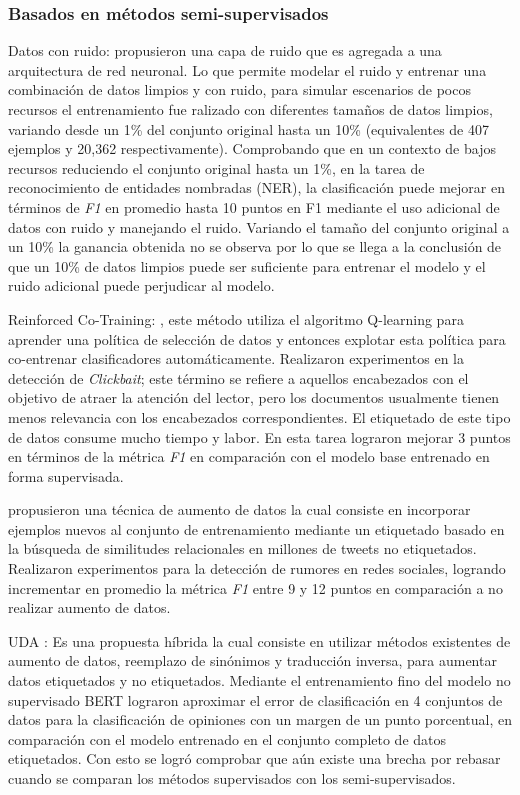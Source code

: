 \subsubsection{Basados en métodos semi-supervisados}

Datos con ruido: \citep{hedderich2018training} propusieron una capa de ruido que es agregada a una arquitectura de red neuronal. Lo que permite modelar el ruido y entrenar una combinación de datos limpios y con ruido, para simular escenarios de pocos recursos el entrenamiento fue ralizado con diferentes tamaños de datos limpios, variando desde un 1\% del conjunto original hasta un 10\% (equivalentes de 407 ejemplos y 20,362 respectivamente). Comprobando que en un contexto de bajos recursos reduciendo el conjunto original hasta un 1\%, en la tarea de reconocimiento de entidades nombradas (NER), la clasificación puede mejorar en términos de \textit{F1} en promedio hasta 10 puntos en F1 mediante el uso adicional de datos con ruido y manejando el ruido. Variando el tamaño del conjunto original a un 10\% la ganancia obtenida no se observa por lo que se llega a la conclusión de que un 10\% de datos limpios puede ser suficiente para entrenar el modelo y el ruido adicional puede perjudicar al modelo.

Reinforced Co-Training: \citep{wu2018reinforced}, este método utiliza el algoritmo Q-learning para aprender una política de selección de datos y entonces explotar esta política para co-entrenar clasificadores automáticamente. Realizaron experimentos en la detección de \textit{Clickbait}; este término se refiere a aquellos encabezados con el objetivo de atraer la atención del lector, pero los documentos usualmente tienen menos relevancia con los encabezados correspondientes. El etiquetado de este tipo de datos consume mucho tiempo y labor. En esta tarea lograron mejorar 3 puntos en términos de la métrica \textit{F1} en comparación con el modelo base entrenado en forma supervisada.

\citep{han2019neural} propusieron una técnica de aumento de datos la cual consiste en incorporar ejemplos nuevos al conjunto de entrenamiento mediante un etiquetado basado en la búsqueda de similitudes relacionales en millones de tweets no etiquetados. Realizaron experimentos para la detección de rumores en redes sociales, logrando incrementar en promedio la métrica \textit{F1} entre 9 y 12 puntos en comparación a no realizar aumento de datos.

UDA \citep{xie2019unsupervised}: Es una propuesta híbrida la cual consiste en utilizar métodos existentes de aumento de datos, reemplazo de sinónimos y traducción inversa, para aumentar datos etiquetados y no etiquetados. Mediante el entrenamiento fino del modelo no supervisado BERT lograron aproximar el error de clasificación en 4 conjuntos de datos para la clasificación de opiniones con un margen de un punto porcentual, en comparación con el modelo entrenado en el conjunto completo de datos etiquetados. Con esto se logró comprobar que aún existe una brecha por rebasar cuando se comparan los métodos supervisados con los semi-supervisados.


